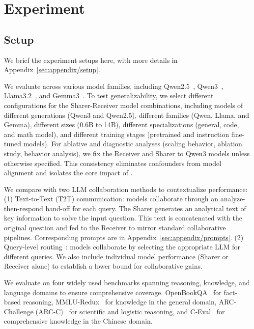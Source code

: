 \section{Experiment}
\label{sec:experiment}

\subsection{Setup}

We brief the experiment setups here, with more details in Appendix~\ref{sec:appendix/setup}.

We evaluate \name across various model families, including Qwen2.5~\citep{yang2024qwen2.5-math, hui2024qwen2.5-coder}, Qwen3~\citep{yang2025qwen3}, Llama3.2~\citep{dubey2024llama}, and Gemma3~\citep{team2025gemma}. To test generalizability, we select different configurations for the Sharer-Receiver model combinations, including models of different generations (Qwen3 and Qwen2.5), different families (Qwen, Llama, and Gemma), different sizes (0.6B to 14B), different specializations (general, code, and math model), and different training stages (pretrained and instruction fine-tuned models). 
For ablative and diagnostic analyses (scaling behavior, ablation study, behavior analysis), we fix the Receiver and Sharer to Qwen3 models unless otherwise specified. 
This consistency eliminates confounders from model alignment and isolates the core impact of \name.

 We compare \name with two LLM collaboration methods to contextualize performance:
(1) Text-to-Text (T2T) communication: models collaborate through an analyze-then-respond hand-off for each query. The Sharer generates an analytical text of key information to solve the input question. This text is concatenated with the original question and fed to the Receiver to mirror standard collaborative pipelines. Corresponding prompts are in Appendix~\ref{sec:appendix/prompts}.
(2) Query-level routing~\citep{ong2024routellm}: models collaborate by selecting the appropriate LLM for different queries. 
We also include individual model performance (Sharer or Receiver alone) to establish a lower bound for collaborative gains.

We evaluate on four widely used benchmarks spanning reasoning, knowledge, and language domains to ensure comprehensive coverage. OpenBookQA~\citep{mihaylov2018can} for fact-based reasoning, MMLU-Redux~\citep{gema2025we} for knowledge in the general domain, ARC-Challenge (ARC-C)~\citep{clark2018think} for scientific and logistic reasoning, and C-Eval~\citep{huang2023c} for comprehensive knowledge in the Chinese domain.

